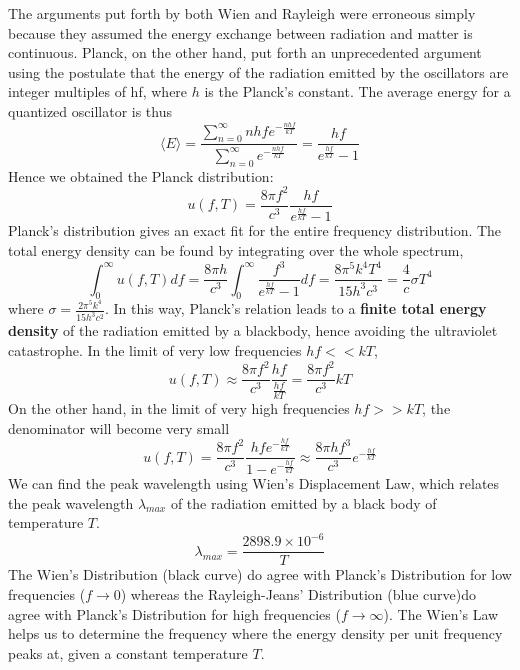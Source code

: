 \documentclass[a4paper]{article}
\begin{document}
\begin{Note}
The arguments put forth by both Wien and Rayleigh were erroneous simply because they assumed the energy exchange between radiation and matter is continuous. Planck, on the other hand, put forth an unprecedented argument using the postulate that the energy of the radiation emitted by the oscillators are integer multiples of hf, where $h$ is the Planck's constant.
The average energy for a quantized oscillator is thus
$$
\big \langle E \big \rangle = \frac{\sum_{n=0}^{\infty} nhfe^{-\frac{nhf}{kT}}}{\sum_{n=0}^{\infty}e^{-\frac{nhf}{kT}}}=\frac{hf}{e^{\frac{hf}{kT}}-1}$$
Hence we obtained the Planck distribution:
$$u(f,T)=\frac{8\pi f^2}{c^3}\frac{hf}{e^{\frac{hf}{kT}}-1}$$
Planck's distribution gives an exact fit for the entire frequency distribution. The total energy density can be found by integrating over the whole spectrum,
$$
\int_{0}^{\infty}u(f,T)df=\frac{8\pi h}{c^3}\int_{0}^{\infty}\frac{f^3}{e^{\frac{hf}{kT}}-1}df=\frac{8\pi^5 k^4T^4}{15h^3c^3}=\frac{4}{c}\sigma T^4$$
where $\sigma = \frac{2\pi^5 k^4}{15h^3c^2}$. In this way, Planck's relation leads to a \textbf{finite total energy density} of the radiation emitted by a blackbody, hence avoiding the ultraviolet catastrophe.
In the limit of very low frequencies $hf<<kT$, 
$$
u(f,T)\approx\frac{8\pi f^2}{c^3}\frac{hf}{\frac{hf}{kT}}=\frac{8\pi f^2}{c^3}kT
$$
On the other hand, in the limit of very high frequencies $hf>>kT$, the denominator will become very small
$$
u(f,T)=\frac{8\pi f^2}{c^3}\frac{hfe^{-\frac{hf}{kT}}}{1-e^{-\frac{hf}{kT}}}\approx\frac{8\pi hf^3}{c^3}e^{-\frac{hf}{kT}}$$
We can find the peak wavelength using Wien's Displacement Law, which relates the peak wavelength $\lambda_{max}$ of the radiation emitted by a black body of temperature $T$.
$$\lambda_{max}=\frac{2898.9\times 10^{-6}}{T}$$
The Wien's Distribution (black curve) do agree with Planck's Distribution for low frequencies ($f\rightarrow 0$) whereas the Rayleigh-Jeans' Distribution (blue curve)do agree with Planck's Distribution for high frequencies ($f\rightarrow\infty$). The Wien's Law helps us to determine the frequency where the energy density per unit frequency peaks at, given a constant temperature $T$.
\begin{center}
\end{center}
\end{Note}
\end{document}
